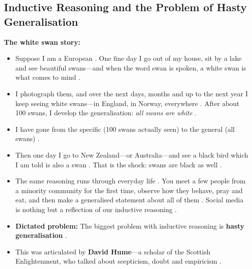 \subsection{Inductive Reasoning and the Problem of Hasty Generalisation}

\begin{ExampleBox}
\textbf{The white swan story:}
\begin{itemize}
    \item Suppose I am a European . One fine day I go out of my house, sit by a lake and see beautiful swans---and when the word swan is spoken, a white swan is what comes to mind .
    \item I photograph them, and over the next days, months and up to the next year I keep seeing white swans---in England, in Norway, everywhere . After about 100 swans, I develop the generalisation: \textit{all swans are white} .
    \item I have gone from the specific (100 swans actually seen) to the general (all swans) .
    \item Then one day I go to New Zealand---or Australia---and see a black bird which I am told is also a swan . That is the shock: swans are black as well .
    \item The same reasoning runs through everyday life . You meet a few people from a minority community for the first time, observe how they behave, pray and eat, and then make a generalised statement about all of them . Social media is nothing but a reflection of our inductive reasoning .
\end{itemize}
\end{ExampleBox}

\begin{CriticalPoint}
\begin{itemize}
    \item \textbf{Dictated problem:} The biggest problem with inductive reasoning is \textbf{hasty generalisation} .
    \item This was articulated by \textbf{David Hume}---a scholar of the Scottish Enlightenment, who talked about scepticism, doubt and empiricism .
\end{itemize}
\end{CriticalPoint}


